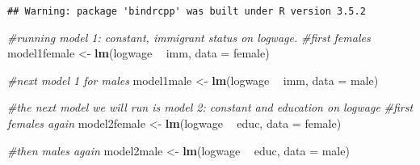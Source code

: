 \documentclass[]{article}
\newenvironment{Shaded}{\begin{snugshade}}{\end{snugshade}}
\newcommand{\CommentTok}[1]{\textcolor[rgb]{0.56,0.35,0.01}{\textit{#1}}}
\newcommand{\DataTypeTok}[1]{\textcolor[rgb]{0.13,0.29,0.53}{#1}}
\newcommand{\DecValTok}[1]{\textcolor[rgb]{0.00,0.00,0.81}{#1}}
\newcommand{\KeywordTok}[1]{\textcolor[rgb]{0.13,0.29,0.53}{\textbf{#1}}}
\newcommand{\NormalTok}[1]{#1}
\newcommand{\OperatorTok}[1]{\textcolor[rgb]{0.81,0.36,0.00}{\textbf{#1}}}
\newcommand{\StringTok}[1]{\textcolor[rgb]{0.31,0.60,0.02}{#1}}
\begin{document}
\begin{verbatim}
## Warning: package 'bindrcpp' was built under R version 3.5.2
\end{verbatim}

\begin{Shaded}
\end{Shaded}

\begin{Shaded}
\begin{Highlighting}[]
\CommentTok{#running model 1: constant, immigrant status on logwage. }
\CommentTok{#first females}
\NormalTok{model1female <-}\StringTok{ }\KeywordTok{lm}\NormalTok{(logwage }\OperatorTok{~}\StringTok{ }\NormalTok{imm, }\DataTypeTok{data =}\NormalTok{ female)}
\end{Highlighting}
\end{Shaded}

\begin{Shaded}
\begin{Highlighting}[]
\CommentTok{#next model 1 for males}
\NormalTok{model1male <-}\StringTok{ }\KeywordTok{lm}\NormalTok{(logwage }\OperatorTok{~}\StringTok{ }\NormalTok{imm, }\DataTypeTok{data =}\NormalTok{ male)}
\end{Highlighting}
\end{Shaded}

\begin{Shaded}
\begin{Highlighting}[]
\CommentTok{#the next model we will run is model 2: constant and education on logwage}
\CommentTok{#first females again}
\NormalTok{model2female <-}\StringTok{ }\KeywordTok{lm}\NormalTok{(logwage }\OperatorTok{~}\StringTok{ }\NormalTok{educ, }\DataTypeTok{data =}\NormalTok{ female)}
\end{Highlighting}
\end{Shaded}

\begin{Shaded}
\begin{Highlighting}[]
\CommentTok{#then males again}
\NormalTok{model2male <-}\StringTok{ }\KeywordTok{lm}\NormalTok{(logwage }\OperatorTok{~}\StringTok{ }\NormalTok{educ, }\DataTypeTok{data =}\NormalTok{ male)}
\end{Highlighting}
\end{Shaded}
\end{document}
